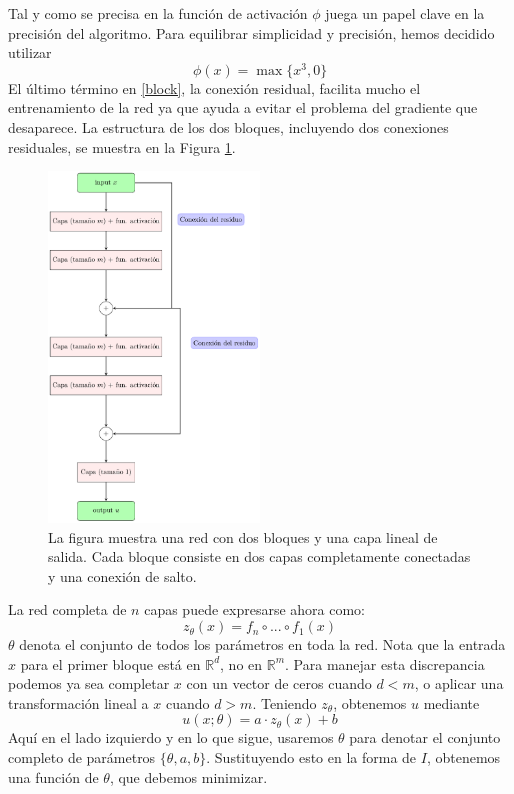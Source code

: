 \documentclass[a4paper,11pt,spanish, twoside, leqno]{tfg-uam}
\theoremstyle{definition}
\begin{document}
Tal y como se precisa en \cite{e2017deepritzmethoddeep} la función de activación $\phi$ juega un papel clave en la precisión del algoritmo. Para equilibrar simplicidad y precisión, hemos decidido utilizar 
\begin{equation}
\phi(x)=\max\{x^3,0\}
\end{equation}
El último término en \eqref{block}, la conexión residual, facilita mucho el entrenamiento de la red ya que ayuda a evitar el problema del gradiente que desaparece. La estructura de los dos bloques, incluyendo dos conexiones residuales, se muestra en la Figura \ref{fig:net_structure_1}.
 
\begin{figure}[!h]
\centering
\vspace{2pt}
\includegraphics[width=0.5\textwidth]{TEX_Figures/deep_ritz_nn.pdf}
\caption{La figura muestra una red con dos bloques y una capa lineal de salida.
Cada bloque consiste en dos capas completamente conectadas y una conexión de salto.\label{fig:net_structure_1}}
\end{figure}

La red completa de $n$ capas puede expresarse ahora como:
\begin{equation}
z_{\theta}(x)=f_n\circ ... \circ f_1(x)
\end{equation}
$\theta$ denota el conjunto de todos los parámetros en toda la red.
Nota que la entrada $x$ para el primer bloque está en $\mathbb{R}^d$, no en $\mathbb{R}^{m}$.
Para manejar esta discrepancia podemos ya sea
completar $x$ con un vector de ceros cuando $d<m$, o aplicar una transformación lineal 
a $x$ cuando $d>m$. 
Teniendo $z_\theta$, obtenemos $u$ mediante
\begin{equation}
u(x; \theta) = a \cdot z_\theta (x) + b
\label{function-form}
\end{equation}
Aquí en el lado izquierdo y en lo que sigue, usaremos
$\theta$ para denotar el conjunto completo de parámetros $\{\theta, a, b \}$. Sustituyendo esto en la forma de $I$, obtenemos una función de $\theta$,
que debemos minimizar.
\end{document}
